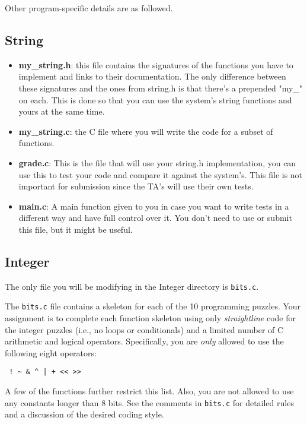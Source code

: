 \documentclass[11pt]{article}
\begin{document}
Other program-specific details are as followed.

\subsection{String}

\begin{itemize}
    \item \textbf{my\_string.h}: this file contains the signatures of the functions you have to implement and links to their documentation. The only difference between these signatures and the ones from string.h is that there's a prepended "my\_" on each. This is done so that you can use the system's string functions and yours at the same time. 
    \item \textbf{my\_string.c}: the C file where you will write the code for a subset of functions.
    \item \textbf{grade.c}: This is the file that will use your string.h implementation, you can use this to test your code and compare it against the system's. This file is not important for submission since the TA's will use their own tests.
    \item \textbf{main.c}: A main function given to you in case you want to write tests in a different way and have full control over it. You don't need to use or submit this file, but it might be useful.
\end{itemize}

\subsection{Integer}

The only file you will be modifying in the Integer directory is {\tt bits.c}.

The {\tt bits.c} file contains a skeleton for each of the 10
programming puzzles.  Your assignment is to complete each function
skeleton using only {\em straightline} code for the integer puzzles
(i.e., no loops or conditionals) and a limited number of C arithmetic
and logical operators. Specifically, you are {\em only} allowed to use
the following eight operators:
\begin{verbatim}
 ! ~ & ^ | + << >>
\end{verbatim}
A few of the functions further restrict this list.  Also, you are not
allowed to use any constants longer than 8 bits.  See the comments in
{\tt bits.c} for detailed rules and a discussion of the desired coding
style.
\end{document}
